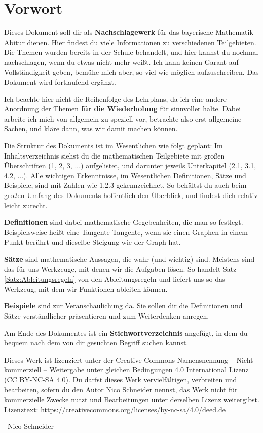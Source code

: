 \documentclass[ngerman, 12pt]{nssheetxea}
\begin{document}
\section*{Vorwort}
\pagestyle{docstyle}
Dieses Dokument soll dir als \textbf{Nachschlagewerk} für das bayerische Mathematik-Abitur dienen. Hier findest du viele Informationen zu verschiedenen Teilgebieten. Die Themen wurden bereits in der Schule behandelt, und hier kannst du nochmal nachschlagen, wenn du etwas nicht mehr weißt. Ich kann keinen Garant auf Vollständigkeit geben, bemühe mich aber, so viel wie möglich aufzuschreiben. Das Dokument wird fortlaufend ergänzt. \par
Ich beachte hier nicht die Reihenfolge des Lehrplans, da ich eine andere Anordnung der Themen \textbf{für die Wiederholung} für sinnvoller halte. Dabei arbeite ich mich von allgemein zu speziell vor, betrachte also erst allgemeine Sachen, und kläre dann, was wir damit machen können. \par
Die Struktur des Dokuments ist im Wesentlichen wie folgt geplant: Im Inhaltsverzeichnis siehst du die mathematischen Teilgebiete mit großen Überschriften (1, 2, 3, ...) aufgelistet, und darunter jeweils Unterkapitel (2.1, 3.1, 4.2, ...). Alle wichtigen Erkenntnisse, im Wesentlichen Definitionen, Sätze und Beispiele, sind mit Zahlen wie 1.2.3 gekennzeichnet. So behältst du auch beim großen Umfang des Dokuments hoffentlich den Überblick, und findest dich relativ leicht zurecht. \par
\textbf{Definitionen} sind dabei mathematische Gegebenheiten, die man so festlegt. Beispielsweise heißt eine Tangente Tangente, wenn sie einen Graphen in einem Punkt berührt und dieselbe Steigung wie der Graph hat. \par
\textbf{Sätze} sind mathematische Aussagen, die wahr (und wichtig) sind. Meistens sind das für uns Werkzeuge, mit denen wir die Aufgaben lösen. So handelt Satz \ref{Satz:Ableitungsregeln} von den Ableitungsregeln und liefert uns so das Werkzeug, mit dem wir Funktionen ableiten können. \par
\textbf{Beispiele} sind zur Veranschaulichung da. Sie sollen dir die Definitionen und Sätze verständlicher präsentieren und zum Weiterdenken anregen. \par
Am Ende des Dokumentes ist ein \textbf{Stichwortverzeichnis} angefügt, in dem du bequem nach dem von dir gesuchten Begriff suchen kannst. \par
Dieses Werk ist lizenziert unter der Creative Commons 
Namensnennung – Nicht kommerziell – Weitergabe unter gleichen Bedingungen 4.0 International Lizenz (CC BY-NC-SA 4.0). \newline
Du darfst dieses Werk vervielfältigen, verbreiten und bearbeiten,
sofern du den Autor Nico Schneider nennst, das Werk nicht für
kommerzielle Zwecke nutzt und Bearbeitungen unter derselben
Lizenz weitergibst. \newline
Lizenztext: \url{https://creativecommons.org/licenses/by-nc-sa/4.0/deed.de} \newline
\begin{flushright}
\textcopyright \ Nico Schneider \ccbyncsaeu
\end{flushright}
\newpage
\end{document}

